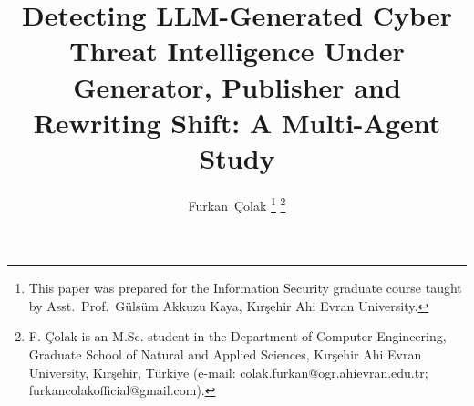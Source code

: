 \documentclass[journal]{IEEEtran}
\begin{document}
\title{Detecting LLM-Generated Cyber Threat Intelligence Under Generator, Publisher and Rewriting Shift:
A Multi-Agent Study}

\author{Furkan~\c{C}olak%
\thanks{This paper was prepared for the Information Security graduate course taught by Asst.\ Prof.\ Gülsüm Akkuzu Kaya,
Kırşehir Ahi Evran University.}%
\thanks{F. \c{C}olak is an M.Sc. student in the Department of Computer Engineering, Graduate School of Natural and Applied
Sciences, Kırşehir Ahi Evran University, Kırşehir, Türkiye (e-mail: colak.furkan@ogr.ahievran.edu.tr;
furkancolakofficial@gmail.com).}}


\maketitle
\end{document}
